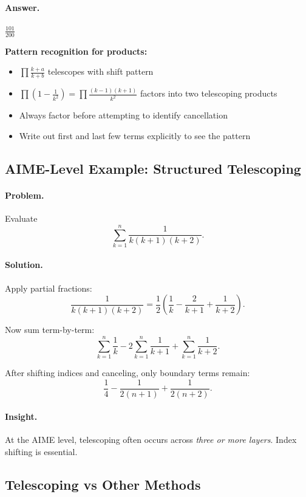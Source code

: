 \documentclass[12pt]{extarticle}
\begin{document}
\paragraph{Answer.} $\boxed{\frac{101}{200}}$

\begin{remarkbox}
\textbf{Pattern recognition for products:}
\begin{itemize}
    \item $\prod \frac{k+a}{k+b}$ telescopes with shift pattern
    \item $\prod \left(1 - \frac{1}{k^2}\right) = \prod \frac{(k-1)(k+1)}{k^2}$ factors into two telescoping products
    \item Always factor before attempting to identify cancellation
    \item Write out first and last few terms explicitly to see the pattern
\end{itemize}
\end{remarkbox}

\subsection*{AIME-Level Example: Structured Telescoping}

\paragraph{Problem.}
Evaluate
\[
\sum_{k=1}^{n} \frac{1}{k(k+1)(k+2)}.
\]

\paragraph{Solution.}
Apply partial fractions:
\[
\frac{1}{k(k+1)(k+2)}
= \frac{1}{2}\left( \frac{1}{k} - \frac{2}{k+1} + \frac{1}{k+2} \right).
\]

Now sum term-by-term:
\[
\sum_{k=1}^{n} \frac{1}{k}
- 2\sum_{k=1}^{n} \frac{1}{k+1}
+ \sum_{k=1}^{n} \frac{1}{k+2}.
\]

After shifting indices and canceling, only boundary terms remain:
\[
\frac{1}{4} - \frac{1}{2(n+1)} + \frac{1}{2(n+2)}.
\]

\paragraph{Insight.}
At the AIME level, telescoping often occurs across \emph{three or more layers}. Index shifting is essential.

\subsection*{Telescoping vs Other Methods}
\end{document}

